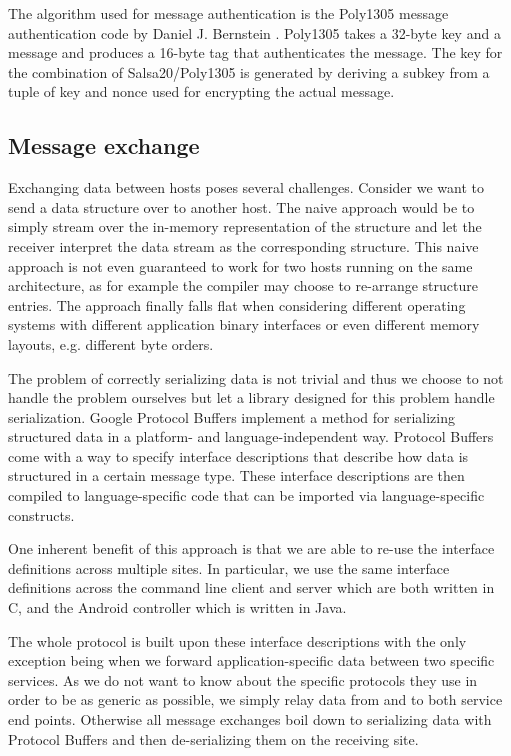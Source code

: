 The algorithm used for message authentication is the Poly1305 message authentication code by Daniel J. Bernstein \cite{bernstein2005poly1305}.
Poly1305 takes a 32-byte key and a message and produces a 16-byte tag that authenticates the message.
The key for the combination of Salsa20/Poly1305 is generated by deriving a subkey from a tuple of key and nonce used for encrypting the actual message.

\subsection{Message exchange}

Exchanging data between hosts poses several challenges.
Consider we want to send a data structure over to another host.
The naive approach would be to simply stream over the in-memory representation of the structure and let the receiver interpret the data stream as the corresponding structure.
This naive approach is not even guaranteed to work for two hosts running on the same architecture, as for example the compiler may choose to re-arrange structure entries.
The approach finally falls flat when considering different operating systems with different application binary interfaces or even different memory layouts, e.g. different byte orders.

The problem of correctly serializing data is not trivial and thus we choose to not handle the problem ourselves but let a library designed for this problem handle serialization.
Google Protocol Buffers \cite{varda2008protocol} implement a method for serializing structured data in a platform- and language-independent way.
Protocol Buffers come with a way to specify interface descriptions that describe how data is structured in a certain message type.
These interface descriptions are then compiled to language-specific code that can be imported via language-specific constructs.

One inherent benefit of this approach is that we are able to re-use the interface definitions across multiple sites.
In particular, we use the same interface definitions across the command line client and server which are both written in C, and the Android controller which is written in Java.

The whole protocol is built upon these interface descriptions with the only exception being when we forward application-specific data between two specific services.
As we do not want to know about the specific protocols they use in order to be as generic as possible, we simply relay data from and to both service end points.
Otherwise all message exchanges boil down to serializing data with Protocol Buffers and then de-serializing them on the receiving site.

